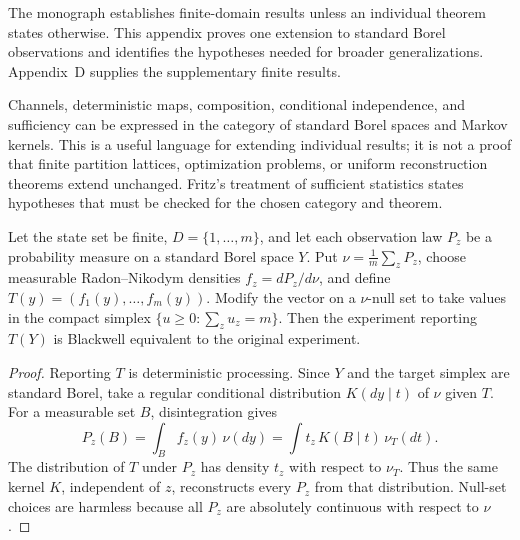
The monograph establishes finite-domain results unless an individual theorem states otherwise. This appendix proves one extension to standard Borel observations and identifies the hypotheses needed for broader generalizations. Appendix~D supplies the supplementary finite results.


Channels, deterministic maps, composition, conditional independence, and sufficiency can be expressed in the category of standard Borel spaces and Markov kernels. This is a useful language for extending individual results; it is not a proof that finite partition lattices, optimization problems, or uniform reconstruction theorems extend unchanged. Fritz's treatment of sufficient statistics \autocite{fritz2020} states hypotheses that must be checked for the chosen category and theorem.


\begin{thmplain}
Let the state set be finite, $D=\{1,\dots,m\}$, and let each observation law $P_z$ be a probability measure on a standard Borel space $Y$. Put $\nu=\tfrac1m\sum_z P_z$, choose measurable Radon--Nikodym densities $f_z=dP_z/d\nu$, and define $T(y)=(f_1(y),\dots,f_m(y))$. Modify the vector on a $\nu$-null set to take values in the compact simplex $\{u\ge 0:\sum_z u_z=m\}$. Then the experiment reporting $T(Y)$ is Blackwell equivalent to the original experiment.
\end{thmplain}
\begin{proof}
Reporting $T$ is deterministic processing. Since $Y$ and the target simplex are standard Borel, take a regular conditional distribution $K(dy\mid t)$ of $\nu$ given $T$. For a measurable set $B$, disintegration gives
\[
P_z(B)=\int_B f_z(y)\,\nu(dy)=\int t_z\,K(B\mid t)\,\nu_T(dt).
\]
The distribution of $T$ under $P_z$ has density $t_z$ with respect to $\nu_T$. Thus the same kernel $K$, independent of $z$, reconstructs every $P_z$ from that distribution. Null-set choices are harmless because all $P_z$ are absolutely continuous with respect to $\nu$.
\end{proof}

